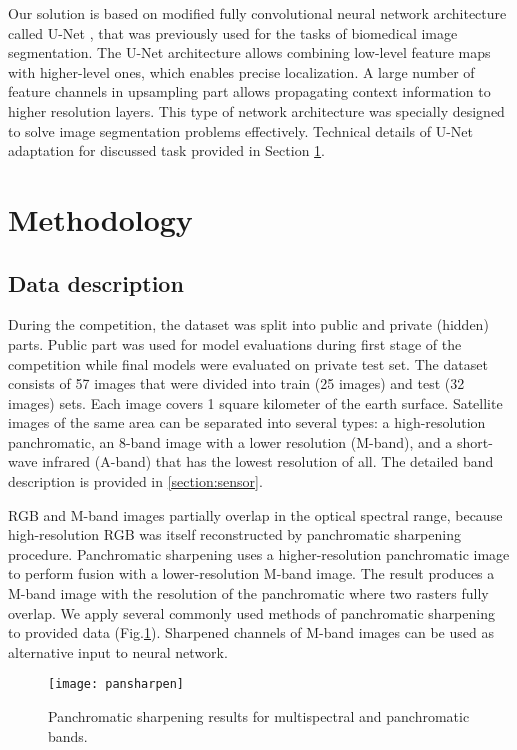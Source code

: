 \documentclass[10pt,twocolumn,letterpaper]{article}
\begin{document}
Our solution is based on modified fully convolutional neural network architecture called U-Net  \cite{unet}, that was previously used for the tasks of biomedical image segmentation. The U-Net architecture allows combining low-level feature maps with higher-level ones, which enables precise localization.  A large number of feature channels in upsampling part allows propagating context information to higher resolution layers.  This type of network architecture was specially designed to solve image segmentation problems effectively. Technical details of U-Net adaptation for discussed task provided in Section \ref{section:methods}.

\section{Methodology}
\label{section:methods}

\subsection{Data description}

During the competition, the dataset was split into public and private (hidden) parts. Public part was used for model evaluations during first stage of the competition while final models were evaluated on private test set.
The dataset consists of 57 images that were divided into train (25 images) and test (32 images) sets. Each image covers 1 square kilometer of the earth surface. Satellite images of the same area can be separated into several types: a high-resolution panchromatic, an 8-band image with a lower resolution (M-band), and a short-wave infrared (A-band) that has the lowest resolution of all. The detailed band description is provided in \autoref{section:sensor}.

RGB and M-band images partially overlap in the optical spectral range, because high-resolution RGB was itself reconstructed by panchromatic sharpening procedure. Panchromatic sharpening uses a higher-resolution panchromatic image to perform  fusion with a lower-resolution M-band image. The result produces a M-band image with the resolution of the panchromatic  where two rasters fully overlap. We apply several commonly used methods of panchromatic sharpening \cite{pansharp} to provided data (Fig.\ref{fig:pan}). Sharpened channels of M-band images can be used as alternative input to neural network.

\begin{figure}[!h]
	\captionsetup{justification=centering}
	\centering
	\texttt{[image: pansharpen]}
	\caption{Panchromatic sharpening results for multispectral and panchromatic bands.}
	\label{fig:pan}
\end{figure}
\end{document}
